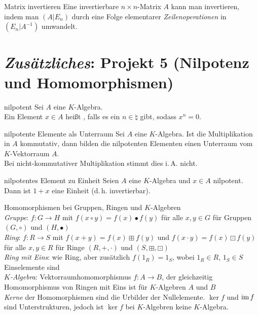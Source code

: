 \begin{Prozedur}{Matrix invertieren}
    Eine invertierbare $n \times n$-Matrix $A$ kann man invertieren, indem man
    $(A | E_n)$ durch eine Folge elementarer \emph{Zeilenoperationen} in
    $(E_n | A^{-1})$ umwandelt.
\end{Prozedur}

\section{%
    \emph{Zusätzliches}: Projekt 5 (Nilpotenz und Homomorphismen)%
}

\begin{Def}{nilpotent}
    Sei $A$ eine $K$-Algebra. \\
    Ein Element $x \in A$ heißt , falls
    es ein $n \in \natural$ gibt, sodass $x^n = 0$.
\end{Def}

\begin{Satz}{nilpotente Elemente als Unterraum}
    Sei $A$ eine $K$-Algebra.
    Ist die Multiplikation in $A$ kommutativ, dann bilden die
    nilpotenten Elementen einen Unterraum vom $K$-Vektorraum $A$. \\
    Bei nicht-kommutativer Multiplikation stimmt dies i.\,A. nicht.
\end{Satz}

\begin{Satz}{nilpotentes Element zu Einheit}
    Seien $A$ eine $K$-Algebra und $x \in A$ nilpotent. \\
    Dann ist $1 + x$ eine Einheit (d.\,h. invertierbar).
\end{Satz}

\begin{Def}{Homomorphismen bei Gruppen, Ringen und
            $K$-Algebren} \\
    \emph{Gruppe}: $f: G \rightarrow H$ mit
    $f(x \circ y) = f(x) \bullet f(y)$ für alle $x, y \in G$ für Gruppen
    $(G, \circ)$ und $(H, \bullet)$ \\
    \emph{Ring}: $f: R \rightarrow S$ mit
    $f(x + y) = f(x) \boxplus f(y)$ und $f(x \cdot y) = f(x) \boxdot f(y)$
    für alle $x, y \in R$ für Ringe
    $(R, \boldsymbol{+}, \boldsymbol{\cdot})$ und $(S, \boxplus, \boxdot)$ \\
    \emph{Ring mit Eins}: wie Ring, aber zusätzlich $f(1_R) = 1_S$, wobei
    $1_R \in R$, $1_S \in S$ Einselemente sind \\
    \emph{$K$-Algebra}: Vektorraumhomomorphismus $f: A \rightarrow B$, der
    gleichzeitig Homomorphismus von Ringen mit Eins ist für $K$-Algebren $A$
    und $B$ \\
    \emph{Kerne} der Homomorphismen sind die Urbilder der Nullelemente.
    $\ker f$ und $\operatorname{im} f$ sind Unterstrukturen, jedoch ist $\ker f$ bei
    $K$-Algebren keine $K$-Algebra.
\end{Def}

